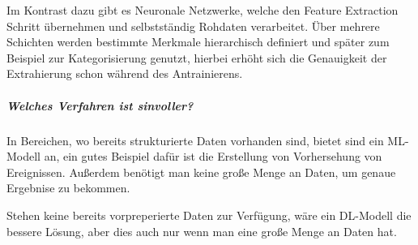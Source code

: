 Im Kontrast dazu gibt es Neuronale Netzwerke, welche den Feature Extraction Schritt übernehmen und selbstständig Rohdaten verarbeitet. Über mehrere Schichten werden bestimmte Merkmale hierarchisch definiert und später zum Beispiel zur Kategorisierung genutzt, hierbei erhöht sich die Genauigkeit der Extrahierung schon während des Antrainierens.

\subparagraph{Welches Verfahren ist sinvoller?}

In Bereichen, wo bereits strukturierte Daten vorhanden sind, bietet sind ein ML-Modell an, ein gutes Beispiel dafür ist die Erstellung von Vorhersehung von Ereignissen. Außerdem benötigt man keine große Menge an Daten, um genaue Ergebnise zu bekommen.

Stehen keine bereits vorpreperierte Daten zur Verfügung, wäre ein DL-Modell die bessere Lösung, aber dies auch nur wenn man eine große Menge an Daten hat.